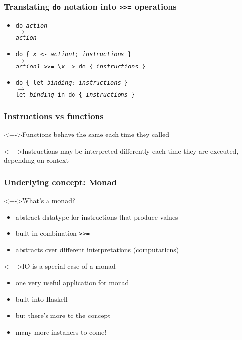 \documentclass{beamer}
\begin{document}
\begin{frame}
  \frametitle{Translating \texttt{do} notation into \texttt{>>=} operations}
  \begin{itemize}
  \item \texttt{do \emph{action}}
    \\ $\longrightarrow$
    \\ \texttt{\emph{action}}
  \item \texttt{do \{ \emph{x} <- \emph{action1}; \emph{instructions} \}}
    \\ $\longrightarrow$
    \\ \texttt{\emph{action1} >>= \textbackslash \emph{x} -> \texttt{do \{ \emph{instructions} \}}}
  \item \texttt{do \{ let \emph{binding}; \emph{instructions} \}}
    \\ $\longrightarrow$
    \\ \texttt{let \emph{binding} in do \{  \emph{instructions} \}}
  \end{itemize}
\end{frame}
\begin{frame}[fragile]
  \frametitle{Instructions vs functions}
  \begin{block}<+->{Functions}
    behave the same each time they called
  \end{block}
  \begin{block}<+->{Instructions}
    may be interpreted differently each time 
    they are executed, depending on context    
  \end{block}
\end{frame}
\begin{frame}
  \frametitle{Underlying concept: \textbf{Monad}}

  \begin{block}<+->{What's a monad?}
    \begin{itemize}
    \item abstract datatype for instructions that produce values
    \item built-in combination \texttt{>>=}
    \item abstracts over different interpretations (computations)
    \end{itemize}
  \end{block}
  \begin{alertblock}<+->{IO is a special case of a monad}
    \begin{itemize}
    \item one very useful application for monad
    \item built into Haskell
    \item but there's more to the concept
    \item many more instances to come!
    \end{itemize}
  \end{alertblock}
\end{frame}
\end{document}
